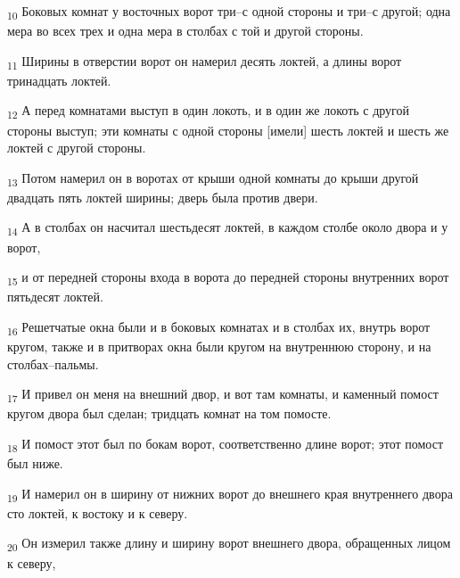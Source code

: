 \begin{tcolorbox}
\textsubscript{10} Боковых комнат у восточных ворот три--с одной стороны и три--с другой; одна мера во всех трех и одна мера в столбах с той и другой стороны.
\end{tcolorbox}
\begin{tcolorbox}
\textsubscript{11} Ширины в отверстии ворот он намерил десять локтей, а длины ворот тринадцать локтей.
\end{tcolorbox}
\begin{tcolorbox}
\textsubscript{12} А перед комнатами выступ в один локоть, и в один же локоть с другой стороны выступ; эти комнаты с одной стороны [имели] шесть локтей и шесть же локтей с другой стороны.
\end{tcolorbox}
\begin{tcolorbox}
\textsubscript{13} Потом намерил он в воротах от крыши одной комнаты до крыши другой двадцать пять локтей ширины; дверь была против двери.
\end{tcolorbox}
\begin{tcolorbox}
\textsubscript{14} А в столбах он насчитал шестьдесят локтей, в каждом столбе около двора и у ворот,
\end{tcolorbox}
\begin{tcolorbox}
\textsubscript{15} и от передней стороны входа в ворота до передней стороны внутренних ворот пятьдесят локтей.
\end{tcolorbox}
\begin{tcolorbox}
\textsubscript{16} Решетчатые окна были и в боковых комнатах и в столбах их, внутрь ворот кругом, также и в притворах окна были кругом на внутреннюю сторону, и на столбах--пальмы.
\end{tcolorbox}
\begin{tcolorbox}
\textsubscript{17} И привел он меня на внешний двор, и вот там комнаты, и каменный помост кругом двора был сделан; тридцать комнат на том помосте.
\end{tcolorbox}
\begin{tcolorbox}
\textsubscript{18} И помост этот был по бокам ворот, соответственно длине ворот; этот помост был ниже.
\end{tcolorbox}
\begin{tcolorbox}
\textsubscript{19} И намерил он в ширину от нижних ворот до внешнего края внутреннего двора сто локтей, к востоку и к северу.
\end{tcolorbox}
\begin{tcolorbox}
\textsubscript{20} Он измерил также длину и ширину ворот внешнего двора, обращенных лицом к северу,
\end{tcolorbox}
